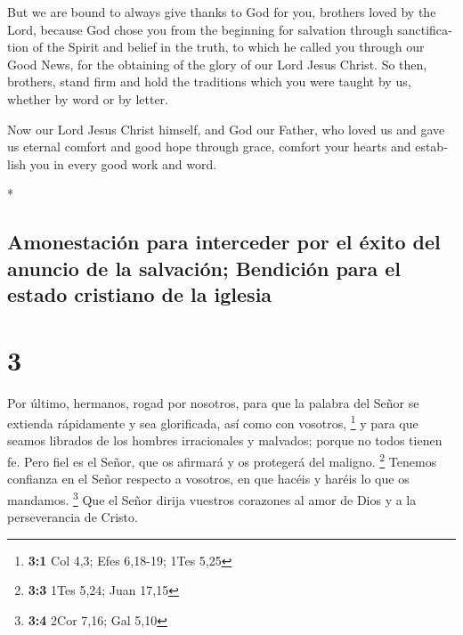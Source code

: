 \begin{paracol}{2}
\begin{otherlanguage}{english}
 But we are bound to always give thanks to God for you,
brothers loved by the Lord, because God chose you from the beginning for
salvation through sanctification of the Spirit and belief in the truth,
 to which he called you through our Good News, for the
obtaining of the glory of our Lord Jesus Christ.  So
then, brothers, stand firm and hold the traditions which you were taught
by us, whether by word or by letter.

 Now our Lord Jesus Christ himself, and God our Father,
who loved us and gave us eternal comfort and good hope through grace,
 comfort your hearts and establish you in every good work
and word.

\end{otherlanguage}

\switchcolumn[0]*

\hypertarget{amonestaciuxf3n-para-interceder-por-el-uxe9xito-del-anuncio-de-la-salvaciuxf3n-bendiciuxf3n-para-el-estado-cristiano-de-la-iglesia}{%
\subsection{Amonestación para interceder por el éxito del anuncio de la
salvación; Bendición para el estado cristiano de la
iglesia}\label{amonestaciuxf3n-para-interceder-por-el-uxe9xito-del-anuncio-de-la-salvaciuxf3n-bendiciuxf3n-para-el-estado-cristiano-de-la-iglesia}}

\hypertarget{section-4}{%
\section{3}\label{section-4}}

 Por último, hermanos, rogad por nosotros, para que la
palabra del Señor se extienda rápidamente y sea glorificada, así como
con vosotros, \footnote{\textbf{3:1} Col 4,3; Efes 6,18-19; 1Tes 5,25}
 y para que seamos librados de los hombres irracionales y
malvados; porque no todos tienen fe.  Pero fiel es el
Señor, que os afirmará y os protegerá del maligno. \footnote{\textbf{3:3}
  1Tes 5,24; Juan 17,15}  Tenemos confianza en el Señor
respecto a vosotros, en que hacéis y haréis lo que os mandamos.
\footnote{\textbf{3:4} 2Cor 7,16; Gal 5,10}  Que el Señor
dirija vuestros corazones al amor de Dios y a la perseverancia de
Cristo.

\hypertarget{reglas-de-conducta-hacia-los-holgazanes-recordatorio-para-llevar-un-estilo-de-vida-ordenado-y-practicar-una-disciplina-prudente}{%
}
\end{paracol}
